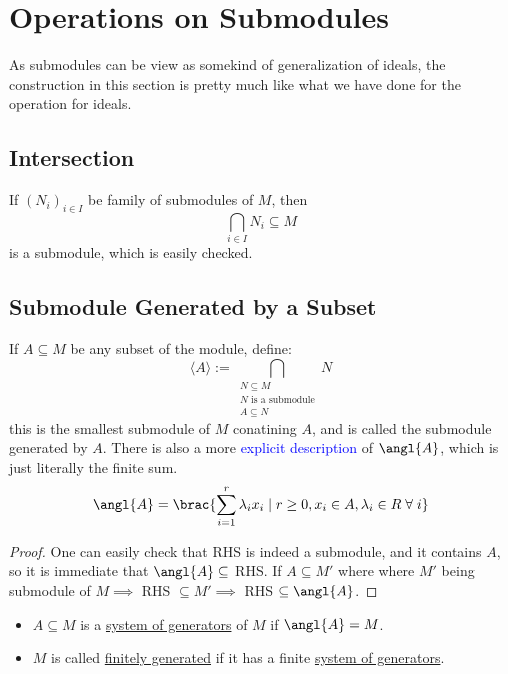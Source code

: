 \section{Operations on Submodules}
As submodules can be view as somekind of generalization of ideals, the construction in this section
is pretty much like what we have done for the operation for ideals.

\subsection{Intersection}

\begin{definition}
	If \( (N_i)_{i\in I} \) be family of submodules of \( M \), then
	\[
		\bigcap_{i\in I} N_i \subseteq M
	\]
	is a submodule, which is easily checked.
\end{definition}

\subsection{Submodule Generated by a Subset}

\begin{definition}
	If \( A \subseteq M \) be any subset of the module, define:
	\[
		\langle A \rangle := \bigcap_{\substack{N \subseteq M \\ N \text{ is a submodule} \\ A \subseteq
				N}} N
	\]
	this is the smallest submodule of \( M \) conatining \( A \), and is called the submodule
	generated by \( A \). There is also a more \textcolor{blue}{explicit description} of \( \angl{A} \), which is just literally the finite sum.
	\[
		\angl{A} = \brac{\sum_{i=1}^r \lambda_i x_i \; | \; r \geq 0, x_i \in A, \lambda_i \in R
			\; \forall \; i}
	\]
	\begin{proof}
		One can easily check that RHS is indeed a submodule, and it contains \( A \), so it is
		immediate that \( \angl{A} \subseteq \) RHS. If \( A \subseteq M' \) where where \( M' \) being
		submodule of \( M \implies \) RHS \( \subseteq M' \implies \) RHS \( \subseteq \angl{A} \).
	\end{proof}
\end{definition}

\begin{note}
	\leavevmode
	\begin{itemize}
		\item \( A \subseteq M \) is a \underline{system of generators} of \( M \) if \( \angl{A} = M \).
		\item \( M \) is called \underline{finitely generated} if it has a finite \underline{system of
			      generators}.
	\end{itemize}
\end{note}

